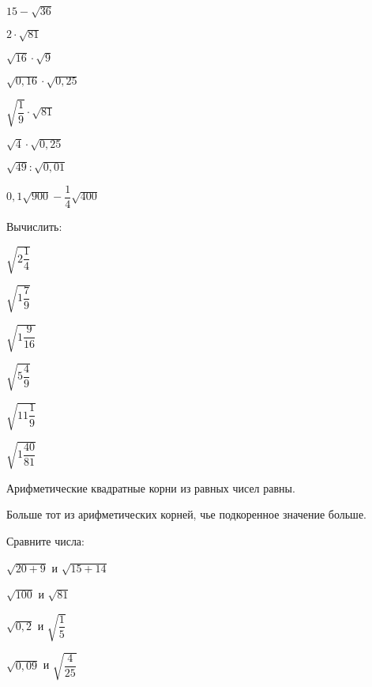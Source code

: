 \begin{class}[number=1]
\begin{listofex}
\begin{enumcols}[itemcolumns=4]
			\item \( 15-\sqrt{36} \)
			\item \( 2\cdot\sqrt{81} \)
			\item \( \sqrt{16}\cdot\sqrt{9} \)
			\item \( \sqrt{0,16}\cdot\sqrt{0,25} \)
			\item \( \sqrt{\dfrac{1}{9}}\cdot\sqrt{81} \)
			\item \( \sqrt{4}\cdot\sqrt{0,25} \)
			\item \( \sqrt{49}:\sqrt{0,01} \)
			\item \( 0,1\sqrt{900}-\dfrac{1}{4}\sqrt{400} \)
		\end{enumcols}
		\item Вычислить:
		\begin{enumcols}[itemcolumns=6]
			\item \( \sqrt{2\dfrac{1}{4}} \)
			\item \( \sqrt{1\dfrac{7}{9}} \)
			\item \( \sqrt{1\dfrac{9}{16}} \)
			\item \( \sqrt{5\dfrac{4}{9}} \)
			\item \( \sqrt{11\dfrac{1}{9}} \)
			\item \( \sqrt{1\dfrac{40}{81}} \)
		\end{enumcols}
	\end{listofex}
	\begin{definit}
		Арифметические квадратные корни из равных чисел равны.
	\end{definit}
	\begin{definit}
		Больше тот из арифметических корней, чье подкоренное значение больше.
	\end{definit}
	\begin{listofex}[resume]
		\item Сравните числа:
		\begin{enumcols}[itemcolumns=3]
			\item \( \sqrt{20+9} \) и \( \sqrt{15+14} \)
			\item \( \sqrt{100} \) и \( \sqrt{81} \)
			\item \( \sqrt{0,2} \) и \( \sqrt{\dfrac{1}{5}} \)
			\item \( \sqrt{0,09} \) и \( \sqrt{\dfrac{4}{25}} \)

\end{enumcols}
\end{listofex}
\end{class}
